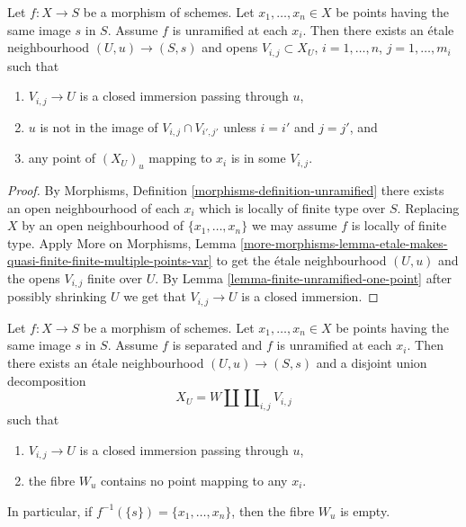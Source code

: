 \begin{lemma}
\label{lemma-unramified-etale-local}
Let $f : X \to S$ be a morphism of schemes.
Let $x_1, \ldots, x_n \in X$ be points having the same image $s$ in $S$.
Assume $f$ is unramified at each $x_i$.
Then there exists an \'etale neighbourhood $(U, u) \to (S, s)$
and opens $V_{i, j} \subset X_U$, $i = 1, \ldots, n$, $j = 1, \ldots, m_i$
such that
\begin{enumerate}
\item $V_{i, j} \to U$ is a closed immersion passing through $u$,
\item $u$ is not in the image of $V_{i, j} \cap V_{i', j'}$ unless
$i = i'$ and $j = j'$, and
\item any point of $(X_U)_u$ mapping to $x_i$ is in some $V_{i, j}$.
\end{enumerate}
\end{lemma}

\begin{proof}
By
Morphisms, Definition \ref{morphisms-definition-unramified}
there exists an open neighbourhood of each $x_i$ which is locally of finite
type over $S$. Replacing $X$ by an open neighbourhood of $\{x_1, \ldots, x_n\}$
we may assume $f$ is locally of finite type. Apply
More on Morphisms, Lemma
\ref{more-morphisms-lemma-etale-makes-quasi-finite-finite-multiple-points-var}
to get the \'etale neighbourhood $(U, u)$ and the opens $V_{i, j}$ finite over
$U$. By
Lemma \ref{lemma-finite-unramified-one-point}
after possibly shrinking $U$ we get that $V_{i, j} \to U$ is a closed
immersion.
\end{proof}

\begin{lemma}
\label{lemma-unramified-etale-local-technical}
Let $f : X \to S$ be a morphism of schemes.
Let $x_1, \ldots, x_n \in X$ be points having the same image $s$ in $S$.
Assume $f$ is separated and $f$ is unramified at each $x_i$.
Then there exists an \'etale neighbourhood $(U, u) \to (S, s)$
and a disjoint union decomposition
$$
X_U =
W \amalg \coprod\nolimits_{i, j} V_{i, j}
$$
such that
\begin{enumerate}
\item $V_{i, j} \to U$ is a closed immersion passing through $u$,
\item the fibre $W_u$ contains no point mapping to any $x_i$.
\end{enumerate}
In particular, if $f^{-1}(\{s\}) = \{x_1, \ldots, x_n\}$, then
the fibre $W_u$ is empty.
\end{lemma}


